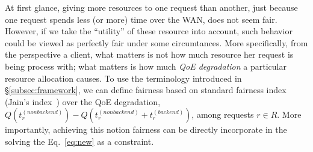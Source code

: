 At first glance, giving more resources to one request than another, just because one request spends less (or more) time over the WAN, does not seem fair.
However, if we take the ``utility'' of these resource into account, such behavior could be viewed as perfectly fair under some circumtances.
More specifically, from the perspective a client, what matters is not how much resource her request is being process with; what matters is how much {\em QoE degradation} a particular resource allocation causes.
To use the  terminology  introduced in \S\ref{subsec:framework}, we can define fairness based on standard fairness index (\eg Jain's index~\cite{??}) over the QoE degradation, \ie $Q\left(t_{r}^{(nonbackend)}\right)-Q\left(t_{r}^{(nonbackend)}+t_{r}^{(backend)}\right)$, among requests $r\in R$.
More importantly, achieving this notion fairness can be directly incorporate in the solving the Eq.~\ref{eq:new} as a constraint.


